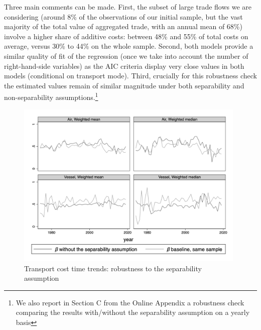 \documentclass[a4paper,11pt]{article}
\begin{document}

Three main comments can be made. First, the subset of large trade flows we are considering (around 8\% of the observations of our initial sample, but the vast majority of the total value of aggregated trade, with an annual mean of 68\%) involve a higher share of additive costs: between 48\% and 55\% of total costs on average, versus 30\% to 44\% on the whole sample.
Second, both models provide a similar quality of fit of the regression (once we take into account the number of right-hand-side variables) as the AIC criteria display very close values in both models (conditional on transport mode). Third, crucially for this robustness check the estimated values remain of similar magnitude under both separability and non-separability assumptions.\footnote{We also report in Section C from the Online Appendix a robustness check comparing the results with/without the separability assumption on a yearly basis} %

\begin{figure}[htbp]
	\caption{Transport cost time trends: robustness to the separability assumption}
	\label{fig:comp_separability_SITC5}
	\begin{center}
		\includegraphics[height=8cm]
		{scatter_chronology_non_separe_pour_robustesse_ns.png}
	\end{center}
\end{figure}
\end{document}
